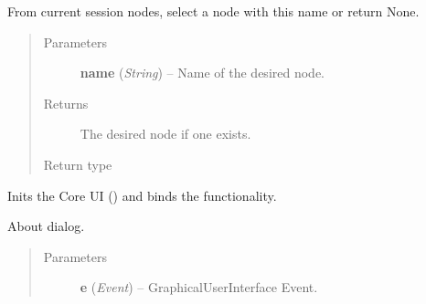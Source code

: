 \documentclass[letterpaper,10pt,english]{sphinxmanual}
\begin{document}
\begin{fulllineitems}
\begin{fulllineitems}
\end{fulllineitems}


\begin{fulllineitems}
\label{diwacs:diwacs.GraphicalUserInterface.GetNodeByName}
From current session nodes, select a node with this name
or return None.
\begin{quote}\begin{description}
\item[{Parameters}] \leavevmode
\textbf{name} (\emph{String}) -- Name of the desired node.

\item[{Returns}] \leavevmode
The desired node if one exists.

\item[{Return type}] \leavevmode
{\hyperref[swnp:swnp.Node]{}}

\end{description}\end{quote}

\end{fulllineitems}


\begin{fulllineitems}
\label{diwacs:diwacs.GraphicalUserInterface.InitUICore}
Inits the Core UI () and
binds the functionality.

\end{fulllineitems}


\begin{fulllineitems}
\label{diwacs:diwacs.GraphicalUserInterface.OnAboutBox}
About dialog.
\begin{quote}\begin{description}
\item[{Parameters}] \leavevmode
\textbf{e} (\emph{Event}) -- GraphicalUserInterface Event.

\end{description}\end{quote}

\end{fulllineitems}


\end{fulllineitems}
\end{document}
